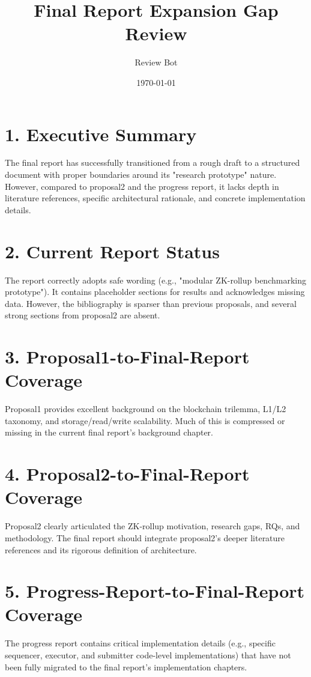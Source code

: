 \documentclass[12pt]{article}
\title{Final Report Expansion Gap Review}
\author{Review Bot}
\date{\today}
\begin{document}
\maketitle

\section{1. Executive Summary}
The final report has successfully transitioned from a rough draft to a structured document with proper boundaries around its "research prototype" nature. However, compared to proposal2 and the progress report, it lacks depth in literature references, specific architectural rationale, and concrete implementation details.

\section{2. Current Report Status}
The report correctly adopts safe wording (e.g., "modular ZK-rollup benchmarking prototype"). It contains placeholder sections for results and acknowledges missing data. However, the bibliography is sparser than previous proposals, and several strong sections from proposal2 are absent.

\section{3. Proposal1-to-Final-Report Coverage}
Proposal1 provides excellent background on the blockchain trilemma, L1/L2 taxonomy, and storage/read/write scalability. Much of this is compressed or missing in the current final report's background chapter.

\section{4. Proposal2-to-Final-Report Coverage}
Proposal2 clearly articulated the ZK-rollup motivation, research gaps, RQs, and methodology. The final report should integrate proposal2's deeper literature references and its rigorous definition of architecture.

\section{5. Progress-Report-to-Final-Report Coverage}
The progress report contains critical implementation details (e.g., specific sequencer, executor, and submitter code-level implementations) that have not been fully migrated to the final report's implementation chapters.
\end{document}
